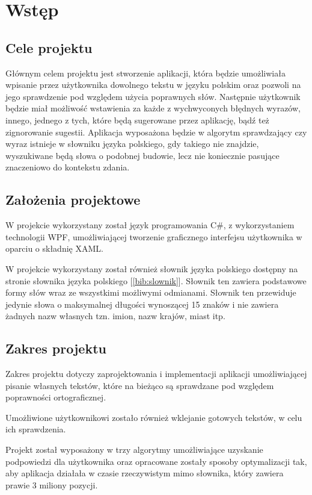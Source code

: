 \chapter{Wstęp}

\section{Cele projektu}

Głównym celem projektu jest stworzenie aplikacji, która będzie umożliwiała wpisanie przez użytkownika dowolnego tekstu w języku polskim oraz pozwoli na jego sprawdzenie pod względem użycia poprawnych słów. Następnie użytkownik będzie miał możliwość wstawienia za każde z wychwyconych błędnych wyrazów, innego, jednego z tych, które będą sugerowane przez aplikację, bądź też zignorowanie sugestii. Aplikacja wyposażona będzie w algorytm sprawdzający czy wyraz istnieje w słowniku języka polskiego, gdy takiego nie znajdzie, wyszukiwane będą słowa o podobnej budowie, lecz nie koniecznie pasujące znaczeniowo do kontekstu zdania.

\section{Założenia projektowe}

W projekcie wykorzystany został język programowania C\#, z wykorzystaniem technologii WPF, umożliwiającej tworzenie graficznego interfejsu użytkownika w oparciu o składnię XAML.

W projekcie wykorzystany został również słownik języka polskiego dostępny na stronie słownika języka polskiego [\ref{bib:slownik}]. Słownik ten zawiera podstawowe formy słów wraz ze wszystkimi możliwymi odmianami. Słownik ten przewiduje jedynie słowa o maksymalnej długości wynoszącej 15 znaków i nie zawiera żadnych nazw własnych tzn. imion, nazw krajów, miast itp.

\section{Zakres projektu}
Zakres projektu dotyczy zaprojektowania i implementacji aplikacji umożliwiającej pisanie własnych tekstów, które na bieżąco są sprawdzane pod względem poprawności ortograficznej.

Umożliwione użytkownikowi zostało również wklejanie gotowych tekstów, w celu ich sprawdzenia.

Projekt został wyposażony w trzy algorytmy umożliwiające uzyskanie podpowiedzi dla użytkownika oraz opracowane zostały sposoby optymalizacji tak, aby aplikacja działała w czasie rzeczywistym mimo słownika, który zawiera prawie 3 miliony pozycji.

